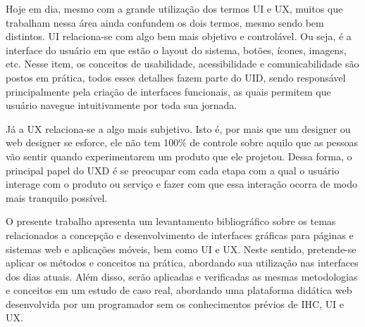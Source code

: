 Hoje em dia, mesmo com a grande utilização dos termos \ac{UI} e \ac{UX}, muitos que trabalham nessa área ainda confundem os dois termos, mesmo sendo bem distintos. \acf{UI} relaciona-se com algo bem mais objetivo e controlável. Ou seja, é a interface do usuário em que estão o layout do sistema, botões, ícones, imagens, etc. Nesse item, os conceitos de usabilidade, acessibilidade e comunicabilidade são postos em prática, todos esses detalhes fazem parte do \ac{UID}, sendo responsável principalmente pela criação de interfaces funcionais, as quais permitem que usuário navegue intuitivamente por toda sua jornada. 

Já a \acf{UX} relaciona-se a algo mais subjetivo. Isto é, por mais que um designer ou web designer se esforce, ele não tem 100\% de controle sobre aquilo que as pessoas vão sentir quando experimentarem um produto que ele projetou. Dessa forma, o principal papel do \ac{UXD} é se preocupar com cada etapa com a qual o usuário interage com o produto ou serviço e fazer com que essa interação ocorra de modo mais tranquilo possível.

O presente trabalho apresenta um levantamento bibliográfico sobre os temas relacionados a concepção e desenvolvimento de interfaces gráficas para páginas e sistemas web e aplicações móveis, bem como \acs{UI} e \acs{UX}. Neste sentido, pretende-se aplicar os métodos e conceitos na prática, abordando sua utilização nas interfaces dos dias atuais. Além disso, serão aplicadas e verificadas as mesmas metodologias e conceitos em um estudo de caso real, abordando uma plataforma didática web desenvolvida por um programador sem os conhecimentos prévios de \acs{IHC}, \acs{UI} e \acs{UX}.



